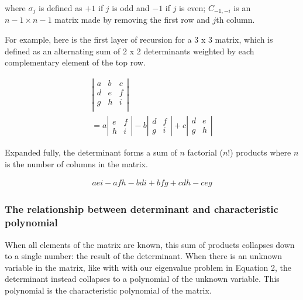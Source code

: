 \documentclass[
  letterpaper,
  DIV=11,
  numbers=noendperiod]{scrartcl}
\begin{document}
where \(\sigma_j\) is defined as \(+1\) if \(j\) is odd and \(-1\) if
\(j\) is even; \(C_{-1, -i}\) is an \(n-1 \times n-1\) matrix made by
removing the first row and \(j\)th column.

For example, here is the first layer of recursion for a 3 x 3 matrix,
which is defined as an alternating sum of 2 x 2 determinants weighted by
each complementary element of the top row.

\begin{align*}
\left|\begin{array}{ccc}
    a & b & c \\
    d & e & f \\
    g & h & i \\
\end{array}\right| \\
= a\left|\begin{array}{cc}e&f\\h&i\end{array}\right| -
    b\left|\begin{array}{cc}d&f\\g&i\end{array}\right| +
    c\left|\begin{array}{cc}d&e\\g&h\end{array}\right|
\end{align*}

Expanded fully, the determinant forms a sum of \(n\) factorial (\(n!\))
products where \(n\) is the number of columns in the matrix.

\begin{align*}
aei - afh - bdi + bfg + cdh - ceg
\end{align*}

\hypertarget{the-relationship-between-determinant-and-characteristic-polynomial}{%
\subsubsection{The relationship between determinant and characteristic
polynomial}\label{the-relationship-between-determinant-and-characteristic-polynomial}}

When all elements of the matrix are known, this sum of products
collapses down to a single number: the result of the determinant. When
there is an unknown variable in the matrix, like with with our
eigenvalue problem in Equation 2, the determinant instead collapses to a
polynomial of the unknown variable. This polynomial is the
characteristic polynomial of the matrix.
\end{document}
